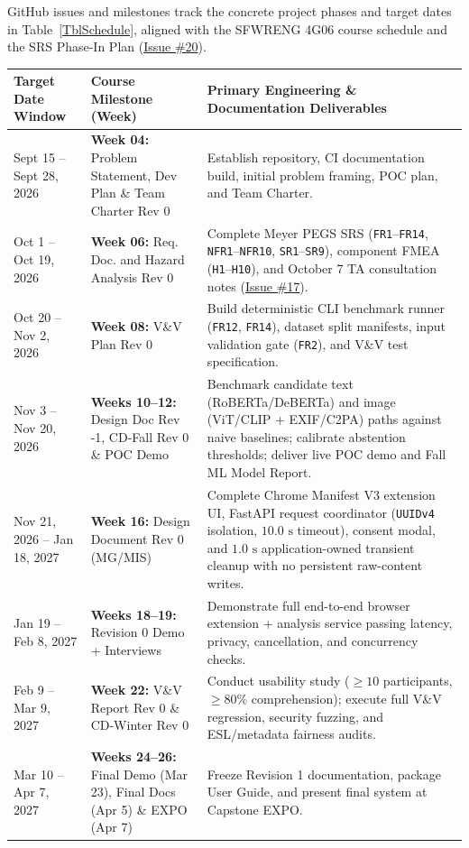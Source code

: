 \documentclass{article}
\begin{document}
GitHub issues and milestones track the concrete project phases and target dates in Table~\ref{TblSchedule}, aligned with the SFWRENG 4G06 course schedule and the SRS Phase-In Plan (\href{https://github.com/richy1337/Verity/issues/20}{Issue \#20}).

\begin{tabularx}{\textwidth}{P{3.6cm} P{3.5cm} Y}
\caption{Project Schedule and Milestone Deadlines (2026--2027)} \label{TblSchedule}\\
\toprule
\textbf{Target Date Window} & \textbf{Course Milestone (Week)} & \textbf{Primary Engineering \& Documentation Deliverables}\\
\midrule
Sept 15 -- Sept 28, 2026 & \textbf{Week 04:} Problem Statement, Dev Plan \& Team Charter Rev 0 & Establish repository, CI documentation build, initial problem framing, POC plan, and Team Charter.\\
\addlinespace
Oct 1 -- Oct 19, 2026 & \textbf{Week 06:} Req. Doc. and Hazard Analysis Rev 0 & Complete Meyer PEGS SRS (\texttt{FR1}--\texttt{FR14}, \texttt{NFR1}--\texttt{NFR10}, \texttt{SR1}--\texttt{SR9}), component FMEA (\texttt{H1}--\texttt{H10}), and October 7 TA consultation notes (\href{https://github.com/richy1337/Verity/issues/17}{Issue \#17}).\\
\addlinespace
Oct 20 -- Nov 2, 2026 & \textbf{Week 08:} V\&V Plan Rev 0 & Build deterministic CLI benchmark runner (\texttt{FR12}, \texttt{FR14}), dataset split manifests, input validation gate (\texttt{FR2}), and V\&V test specification.\\
\addlinespace
Nov 3 -- Nov 20, 2026 & \textbf{Weeks 10--12:} Design Doc Rev -1, CD-Fall Rev 0 \& POC Demo & Benchmark candidate text (RoBERTa/DeBERTa) and image (ViT/CLIP + EXIF/C2PA) paths against naive baselines; calibrate abstention thresholds; deliver live POC demo and Fall ML Model Report.\\
\addlinespace
Nov 21, 2026 -- Jan 18, 2027 & \textbf{Week 16:} Design Document Rev 0 (MG/MIS) & Complete Chrome Manifest V3 extension UI, FastAPI request coordinator (\texttt{UUIDv4} isolation, $10.0\text{ s}$ timeout), consent modal, and $1.0\text{ s}$ application-owned transient cleanup with no persistent raw-content writes.\\
\addlinespace
Jan 19 -- Feb 8, 2027 & \textbf{Weeks 18--19:} Revision 0 Demo + Interviews & Demonstrate full end-to-end browser extension + analysis service passing latency, privacy, cancellation, and concurrency checks.\\
\addlinespace
Feb 9 -- Mar 9, 2027 & \textbf{Week 22:} V\&V Report Rev 0 \& CD-Winter Rev 0 & Conduct usability study ($\ge 10$ participants, $\ge 80\%$ comprehension); execute full V\&V regression, security fuzzing, and ESL/metadata fairness audits.\\
\addlinespace
Mar 10 -- Apr 7, 2027 & \textbf{Weeks 24--26:} Final Demo (Mar 23), Final Docs (Apr 5) \& EXPO (Apr 7) & Freeze Revision 1 documentation, package User Guide, and present final system at Capstone EXPO.\\
\bottomrule
\end{tabularx}
\end{document}

